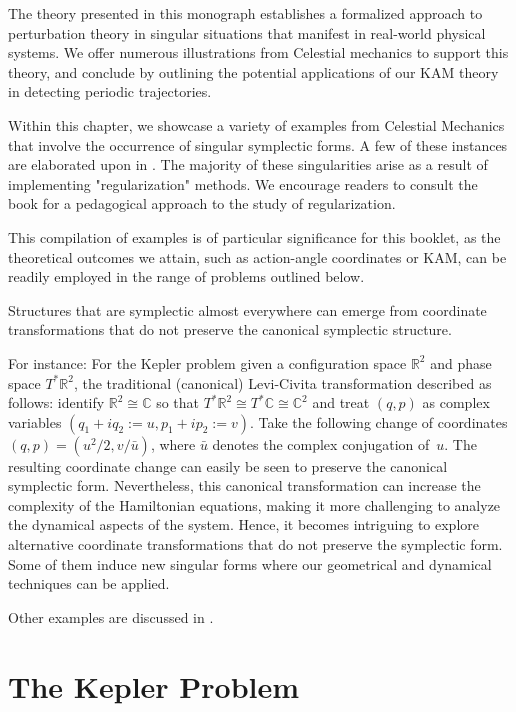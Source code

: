 The theory presented in this monograph establishes a formalized approach to perturbation theory in singular situations that manifest in real-world physical systems. We offer numerous illustrations from Celestial mechanics to support this theory, and conclude by outlining the potential applications of our KAM theory in detecting periodic trajectories.



Within this chapter, we showcase a variety of examples from Celestial Mechanics that involve the occurrence of singular symplectic forms. A few of these instances are elaborated upon in \cite{binvitation}. The majority of these singularities arise as a result of implementing "regularization" methods. We encourage readers to consult the book \cite{knauf} for a pedagogical approach to the study of regularization. 

This compilation of examples is of particular significance for this booklet, as the theoretical outcomes we attain, such as action-angle coordinates or KAM, can be readily employed in the range of problems outlined below.




Structures that are symplectic almost everywhere can emerge from coordinate transformations  that do not preserve the canonical symplectic structure. 

For instance: For the Kepler problem given a configuration space $\mathbb{R}^2$ and phase space $T^*\mathbb{R}^2$,  the traditional (canonical) Levi-Civita transformation described as follows: identify $\mathbb{R}^2\cong\mathbb{C}$ so that $T^*\mathbb{R}^2\cong T^*\mathbb{C}\cong \mathbb{C}^2$ and treat $(q,p)$ as complex variables $(q_1+iq_2:=u,p_1+ip_2:=v)$. Take the following change of coordinates $(q,p) = (u^2/2, v/\bar{u})$, where $\bar{u}$ denotes the complex conjugation of~$u$. The resulting coordinate change can easily be seen to preserve the canonical symplectic form. 
Nevertheless, this canonical transformation can increase the complexity of the Hamiltonian equations, making it more challenging to analyze the dynamical aspects of the system. Hence, it becomes intriguing to explore alternative coordinate transformations that do not preserve the symplectic form. Some of them induce new singular forms where our geometrical and dynamical techniques can be applied.

Other examples are discussed in \cite{DKM17}.

\section{The Kepler Problem}

